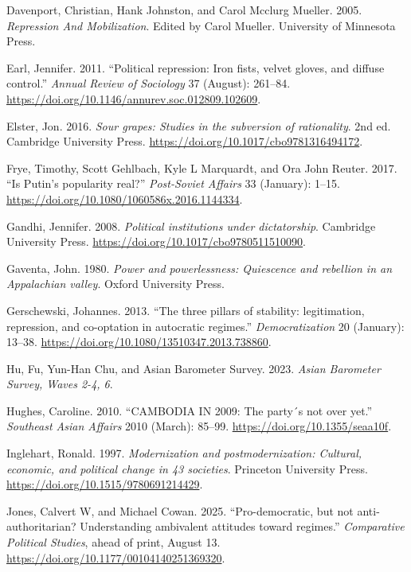 \documentclass[
  12pt,
  letterpaper]{article}
\newlength{\cslhangindent}
\newenvironment{CSLReferences}[2] %
 {\begin{list}{}{%
  \setlength{\itemindent}{0pt}
  \setlength{\leftmargin}{0pt}
  \setlength{\parsep}{0pt}
  \ifodd #1
   \setlength{\leftmargin}{\cslhangindent}
   \setlength{\itemindent}{-1\cslhangindent}
  \fi
  \setlength{\itemsep}{#2\baselineskip}}}
 {\end{list}}
\begin{document}
\begin{CSLReferences}{1}{1}
Davenport, Christian, Hank Johnston, and Carol Mcclurg Mueller. 2005.
\emph{{Repression And Mobilization}}. Edited by Carol Mueller.
University of Minnesota Press.

Earl, Jennifer. 2011. {``{Political repression: Iron fists, velvet
gloves, and diffuse control}.''} \emph{Annual Review of Sociology} 37
(August): 261--84.
\url{https://doi.org/10.1146/annurev.soc.012809.102609}.

Elster, Jon. 2016. \emph{{Sour grapes: Studies in the subversion of
rationality}}. 2nd ed. Cambridge University Press.
\url{https://doi.org/10.1017/cbo9781316494172}.

Frye, Timothy, Scott Gehlbach, Kyle L Marquardt, and Ora John Reuter.
2017. {``{Is Putin's popularity real?}''} \emph{Post-Soviet Affairs} 33
(January): 1--15. \url{https://doi.org/10.1080/1060586x.2016.1144334}.

Gandhi, Jennifer. 2008. \emph{{Political institutions under
dictatorship}}. Cambridge University Press.
\url{https://doi.org/10.1017/cbo9780511510090}.

Gaventa, John. 1980. \emph{{Power and powerlessness: Quiescence and
rebellion in an Appalachian valley}}. Oxford University Press.

Gerschewski, Johannes. 2013. {``{The three pillars of stability:
legitimation, repression, and co-optation in autocratic regimes}.''}
\emph{Democratization} 20 (January): 13--38.
\url{https://doi.org/10.1080/13510347.2013.738860}.

Hu, Fu, Yun-Han Chu, and Asian Barometer Survey. 2023. \emph{{Asian
Barometer Survey, Waves 2-4, 6}}.

Hughes, Caroline. 2010. {``{CAMBODIA IN 2009: The party´s not over
yet}.''} \emph{Southeast Asian Affairs} 2010 (March): 85--99.
\url{https://doi.org/10.1355/seaa10f}.

Inglehart, Ronald. 1997. \emph{{Modernization and postmodernization:
Cultural, economic, and political change in 43 societies}}. Princeton
University Press. \url{https://doi.org/10.1515/9780691214429}.

Jones, Calvert W, and Michael Cowan. 2025. {``{Pro-democratic, but not
anti-authoritarian? Understanding ambivalent attitudes toward
regimes}.''} \emph{Comparative Political Studies}, ahead of print,
August 13. \url{https://doi.org/10.1177/00104140251369320}.


\end{CSLReferences}
\end{document}
